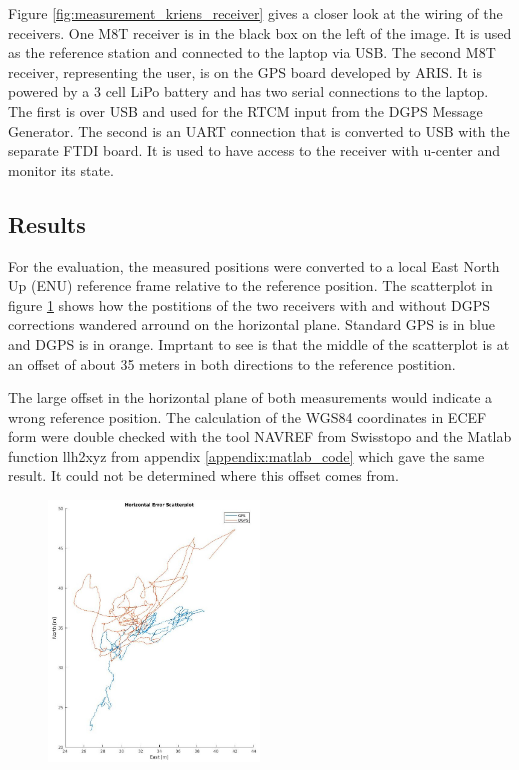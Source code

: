 Figure \ref{fig:measurement_kriens_receiver} gives a closer look at the wiring of the receivers.
One M8T receiver is in the black box on the left of the image.
It is used as the reference station and connected to the laptop via USB.
The second M8T receiver, representing the user, is on the GPS board developed by ARIS.
It is powered by a 3 cell LiPo battery and has two serial connections to the laptop.
The first is over USB and used for the RTCM input from the DGPS Message Generator.
The second is an UART connection that is converted to USB with the separate FTDI board.
It is used to have access to the receiver with u-center and monitor its state.

\subsection{Results}

For the evaluation, the measured positions were converted to a local East North Up (ENU) reference frame relative to the reference position.
The scatterplot in figure \ref{fig:scatterplot} shows how the postitions of the two receivers with and without DGPS corrections wandered arround on the horizontal plane.
Standard GPS is in blue and DGPS is in orange.
Imprtant to see is that the middle of the scatterplot is at an offset of about 35 meters in both directions to the reference postition.
  
The large offset in the horizontal plane of both measurements would indicate a wrong reference position.
The calculation of the WGS84 coordinates in ECEF form were double checked with the tool NAVREF from Swisstopo and the Matlab function llh2xyz from appendix \ref{appendix:matlab_code} which gave the same result.
It could not be determined where this offset comes from.

\begin{figure}
  \centering
 \includegraphics[width=0.5\textwidth]{images/Scatterplot.jpg}
 \label{fig:scatterplot}
\end{figure}

